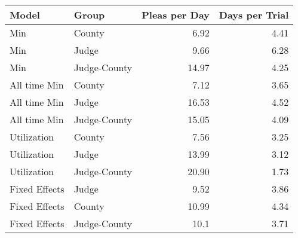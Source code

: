 \begin{tabular}{llrr}
\toprule
      Model &         Group &  Pleas per Day &  Days per Trial \\
\midrule
        Min &        County &           6.92 &            4.41 \\
        Min &       Judge &           9.66 &            6.28 \\
        Min & Judge-County &          14.97 &            4.25 \\
  All time Min &        County &           7.12 &            3.65 \\
  All time Min &       Judge &           16.53 &            4.52 \\
  All time Min & Judge-County &          15.05 &            4.09 \\
Utilization &        County &           7.56 &            3.25 \\
Utilization &       Judge &          13.99 &            3.12 \\
Utilization & Judge-County &          20.90 &            1.73 \\
Fixed Effects & Judge & 9.52 & 3.86 \\
Fixed Effects & County & 10.99 & 4.34 \\
Fixed Effects & Judge-County & 10.1 & 3.71 \\
\bottomrule
\end{tabular}
